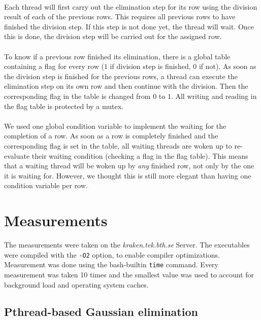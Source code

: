 \documentclass[]{article}
\begin{document}
\paragraph{} Each thread will first carry out the elimination step for its row using the division result of each of the previous rows. This requires all previous rows to have finished the division step. If this step is not done yet, the thread will wait. Once this is done, the division step will be carried out for the assigned row.

\paragraph{} To know if a previous row finished its elimination, there is a global table containing a flag for every row ($1$ if division step is finished, $0$ if not). As soon as the division step is finished for the previous rows, a thread can execute the elimination step on its own row and then continue with the division. Then the corresponding flag in the table is changed from $0$ to $1$. All writing and reading in the flag table is protected by a mutex.

\paragraph{} We used one global condition variable to implement the waiting for the completion of a row. As soon as a row is completely finished and the corresponding flag is set in the table, all waiting threads are woken up to re-evaluate their waiting condition (checking a flag in the flag table). This means that a waiting thread will be woken up by \emph{any} finished row, not only by the one it is waiting for. However, we thought this is still more elegant than having one condition variable per row.

\section{Measurements}

The measurements were taken on the \emph{kraken.tek.bth.se} Server. The executables were compiled with the \texttt{-O2} option, to enable compiler optimizations. Measurement was done using the bash-builtin \texttt{time} command. Every measurement was taken 10 times and the smallest value was used to account for background load and operating system caches.

\subsection{Pthread-based Gaussian elimination}
\end{document}
